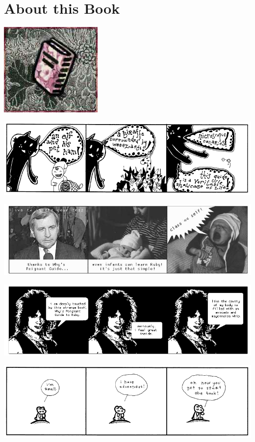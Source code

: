 \documentclass[10pt,twoside]{report}
\begin{document}
\chapter{About this Book}
\vfill
\begin{center}
  \includegraphics{cache/chapterpoignantguide1.png}
\end{center}
\vspace{2cm}
\newpage
\thispagestyle{empty}
\mbox{}
\clearpage
	\includegraphics[width=1.0\textwidth]{cache/1.png} 

	\includegraphics[width=1.0\textwidth]{cache/2.png} 

	\includegraphics[width=1.0\textwidth]{cache/3.png} 

	\includegraphics[width=1.0\textwidth]{cache/4.png} 
\end{document}
